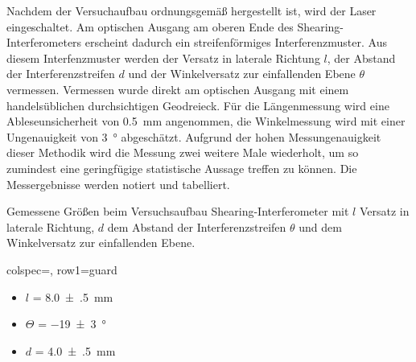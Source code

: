 \documentclass[ngerman]{scrartcl}
\begin{document}
Nachdem der Versuchaufbau ordnungsgemäß hergestellt ist, wird der Laser eingeschaltet. Am optischen Ausgang am oberen Ende des Shearing-Interferometers erscheint dadurch ein streifenförmiges Interferenzmuster. Aus diesem Interfenzmuster werden der Versatz in laterale Richtung $l$, der Abstand der Interferenzstreifen $d$ und der Winkelversatz zur einfallenden Ebene $\theta$ vermessen. Vermessen wurde direkt am optischen Ausgang mit einem handelsüblichen durchsichtigen Geodreieck. Für die Längenmessung wird eine Ableseunsicherheit von \SI{0.5}{mm} angenommen, die Winkelmessung wird mit einer Ungenauigkeit von \SI{3}{\degree} abgeschätzt. Aufgrund der hohen Messungenauigkeit dieser Methodik wird die Messung zwei weitere Male wiederholt, um so zumindest eine geringfügige statistische Aussage treffen zu können. Die Messergebnisse werden notiert und tabelliert.
\begin{table}[H]
    \centering
    \begin{samepage}
        \caption[Messung Shearing]{Gemessene Größen beim Versuchsaufbau Shearing-Interferometer mit $l$ Versatz in laterale Richtung, $d$ dem Abstand der Interferenzstreifen $\theta$ und dem Winkelversatz zur einfallenden Ebene. }
        \label{tab:}
        \begin{tblr}{colspec={}, row{1}={guard}}
        \end{tblr}
    \end{samepage}
\end{table}

\begin{itemize}
    \item $l$ = \SI{8.0(5)}{\milli\meter}
    \item $\Theta$ = \SI{-19(3)}{\degree}
    \item $d$ = \SI{4.0(5)}{\milli\meter}
\end{itemize}
\end{document}
